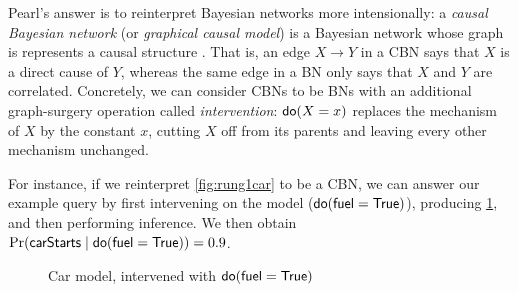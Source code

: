 \documentclass[11pt,a4paper]{article}
\begin{document}
Pearl's answer is to reinterpret Bayesian networks more intensionally: a \emph{causal Bayesian network} (or \emph{graphical causal model}) is a Bayesian network whose graph is represents a causal structure \cite{pearl2009causality,spirtes2000causation}. That is, an edge $X \to Y$ in a CBN says that $X$ is a direct cause of $Y$, whereas the same edge in a BN only says that $X$ and $Y$ are correlated. Concretely, we can consider CBNs to be BNs with an additional graph-surgery operation called \emph{intervention}: $\mathsf{do}(X = x)$ replaces the mechanism of $X$ by the constant $x$, cutting $X$ off from its parents and leaving every other mechanism unchanged. 

For instance, if we reinterpret \cref{fig:rung1car} to be a CBN, we can answer our example query by first intervening on the model ($\mathsf{do}(\mathsf{fuel} = \mathsf{True})$), producing \cref{fig:rung2car}, and then performing inference. We then obtain $\Pr(\mathsf{carStarts} \mid \mathsf{do}(\mathsf{fuel} = \mathsf{True})) = 0.9$. 

\begin{figure}
    \centering
\caption{Car model, intervened with $\mathsf{do}(\mathsf{fuel} = \mathsf{True})$ }
\label{fig:rung2car}
\end{figure}
\end{document}
